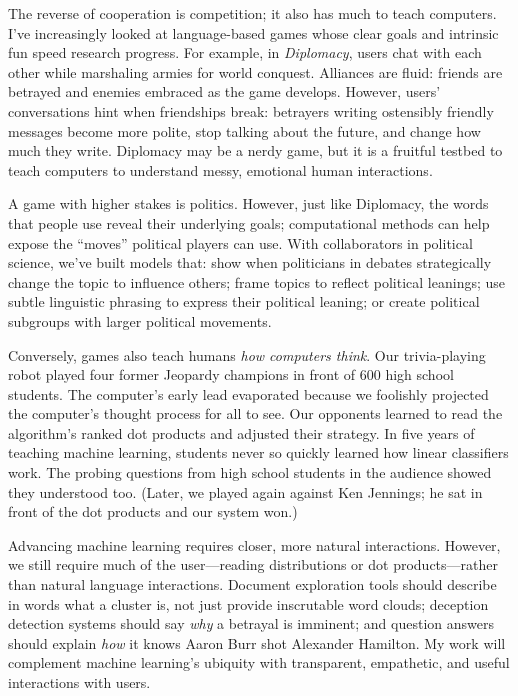 \documentclass[11pt, amssymb, one column]{article}
\begin{document}
The reverse of cooperation is competition; it also has much to teach
computers. I've increasingly looked at language-based games whose clear goals
and intrinsic fun speed research progress.  For example, in \emph{Diplomacy},
users chat with each other while marshaling armies for world conquest.
Alliances are fluid: friends are betrayed and enemies embraced as the game
develops. However, users' conversations hint when friendships break:
betrayers writing ostensibly friendly messages become more
polite, stop talking about the future, and change how much they
write.  Diplomacy may be a nerdy game, but it is a fruitful
testbed to teach computers to understand messy, emotional human interactions.

A game with higher stakes is politics.  However, just like Diplomacy,
the words that people use reveal their underlying goals; computational
methods can help expose the ``moves'' political players can use.  With
collaborators in political science, we've built models that: show when
politicians in debates strategically change the topic to influence
others; frame topics to reflect political leanings; use subtle
linguistic phrasing to express their political leaning; or create
political subgroups with larger political movements.

Conversely, games also teach humans \emph{how computers think}.  Our
trivia-playing robot played four former Jeopardy champions
in front of 600 high school students. The computer's early
lead evaporated because we foolishly projected the computer's thought process for
all to see.  Our opponents learned to read the algorithm's ranked dot
products and adjusted their strategy. In five years
of teaching machine learning, students never so
quickly learned how linear classifiers work.  The probing questions from
high school students in the audience showed they understood too.
(Later, we played again against Ken Jennings; he sat in front of
the dot products and our system won.)

Advancing machine learning requires closer, more natural interactions.  However,
we still require much of the user---reading distributions or dot
products---rather than natural language interactions.  Document exploration
tools should describe in words what a cluster is, not just provide inscrutable
word clouds; deception detection systems should say \emph{why} a betrayal is
imminent; and question answers should explain \emph{how} it knows Aaron Burr
shot Alexander Hamilton. My work will complement machine learning's ubiquity
with transparent, empathetic, and useful interactions with users.
\end{document}
